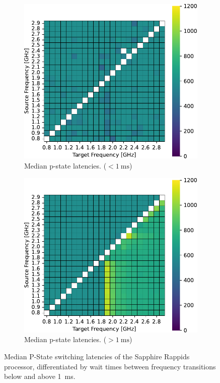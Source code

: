 \begin{figure}[]
    \begin{subfigure}[t]{0.45\linewidth}
        \centering
        \includegraphics[width=\linewidth]{fig/ftalat_median_<1ms_hati.pdf}
        \caption{\label{fig:pstate_latencies_median_lt_1ms}Median p-state latencies. ($< \SI{1}{\ms}$)}
    \end{subfigure}
    \hfill
    \begin{subfigure}[t]{0.45\linewidth}
        \centering
        \includegraphics[width=\linewidth]{fig/ftalat_median_>1ms_hati.pdf}
        \caption{\label{fig:pstate_latencies_median_gt_1ms}Median p-state latencies. ($> \SI{1}{\ms}$)}
    \end{subfigure}
    \caption{\label{fig:pstate_latencies_median}Median P-State switching latencies of the Sapphire Rappids processor, differentiated by wait times between frequency transitions below and above \SI{1}{\ms}.}
\end{figure}

